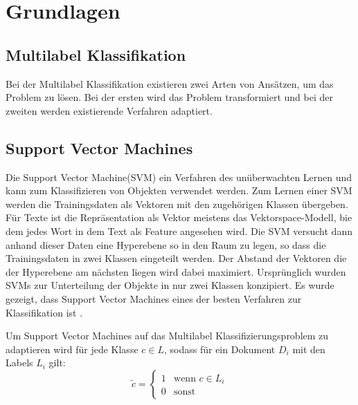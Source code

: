 \section{Grundlagen}
\subsection{Multilabel Klassifikation}
\label{sub:multilabel_klassifikation}
Bei der Multilabel Klassifikation existieren zwei Arten von Ansätzen, um das Problem zu lösen. Bei der ersten wird das Problem transformiert und bei der zweiten werden existierende Verfahren adaptiert.

\subsection{Support Vector Machines}
\label{sub:support_vector_machines}
Die  Support Vector Machine(SVM) ein Verfahren des unüberwachten Lernen und kann zum Klassifizieren von Objekten verwendet werden. Zum Lernen einer SVM werden die Trainingsdaten als Vektoren mit den zugehörigen Klassen übergeben. Für Texte ist die Repräsentation als Vektor meistens das Vektorspace-Modell, bie dem jedes Wort in dem Text als Feature angesehen wird. Die SVM versucht dann anhand dieser Daten eine Hyperebene so in den Raum zu legen, so dass die Trainingsdaten in zwei Klassen eingeteilt werden. Der Abstand der Vektoren die der Hyperebene am nächsten liegen wird dabei maximiert. Ursprünglich wurden SVMs zur Unterteilung der Objekte in nur zwei Klassen konzipiert.
Es wurde gezeigt, dass Support Vector Machines eines der besten Verfahren zur Klassifikation ist \cite{Joachims:1998:TCS:645326.649721}.







Um Support Vector Machines auf das Multilabel Klassifizierungsproblem zu adaptieren wird für jede Klasse $c \in L$, sodass für ein Dokument $D_i$ mit den Labels $L_i$ gilt:
\[
    \tilde c =
    \begin{cases}
        1 &\mbox{wenn } c \in L_i \\
        0 &\mbox{sonst}
    \end{cases}
\]

